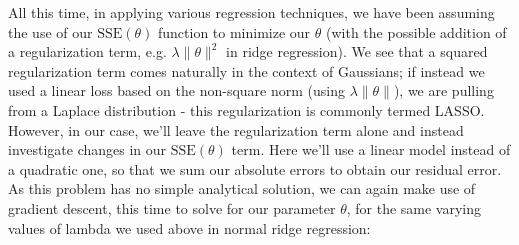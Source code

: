 \documentclass[11pt,letterpaper]{article}
\begin{document}
All this time, in applying various regression techniques, we have been assuming the use of our $\text{SSE}(\theta)$ function to minimize our $\theta$ (with the possible addition of a regularization term, e.g. $\lambda\lVert\theta\rVert^2$ in ridge regression). We see that a squared regularization term comes naturally in the context of Gaussians; if instead we used a linear loss based on the non-square norm (using $\lambda\lVert\theta\rVert$), we are pulling from a Laplace distribution - this regularization is commonly termed LASSO.\\
However, in our case, we'll leave the regularization term alone and instead investigate changes in our $\text{SSE}(\theta)$ term. Here we'll use a linear model instead of a quadratic one, so that we sum our absolute errors to obtain our residual error.\\
As this problem has no simple analytical solution, we can again make use of gradient descent, this time to solve for our parameter $\theta$, for the same varying values of lambda we used above in normal ridge regression:
\end{document}
